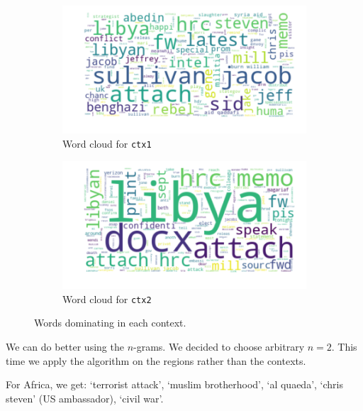 \documentclass[11pt]{article}
\begin{document}
\begin{figure}[!t]
	\centering
	\begin{subfigure}[b]{0.45\linewidth}
		\centering
		\includegraphics[width=\linewidth]{images/word_cloud_ctx1.png}
		\caption[]%
		{{\small Word cloud for \texttt{ctx1}}}
		\label{fig:word_cloud_ctx1}
	\end{subfigure}
	\begin{subfigure}[b]{0.45\linewidth}
		\centering
		\includegraphics[width=\linewidth]{images/word_cloud_ctx2.png}
		\caption[]%
		{{\small Word cloud for \texttt{ctx2}}}
		\label{fig:word_cloud_ctx2}
	\end{subfigure}
	\caption{Words dominating in each context.}
	\label{fig:word_cloud}
\end{figure}

We can do better using the $n$-grams. We decided to choose arbitrary $n = 2$. This time we apply the algorithm on the regions rather than the contexts.

For Africa, we get: `terrorist attack', `muslim brotherhood', `al quaeda', `chris steven' (US ambassador), `civil war'.
\end{document}
